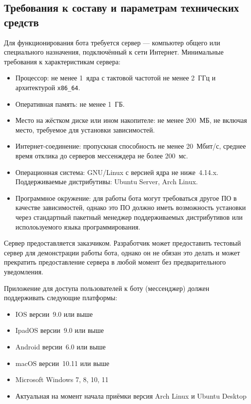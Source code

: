\subsection{Требования к составу и параметрам технических средств}
    \label{sec:req:hw}
    Для функционирования бота требуется сервер --- компьютер общего или специального назначения,
    подключённый к сети Интернет. Минимальные требования к характеристикам сервера:
    \begin{itemize}
        \item
            Процессор: не менее 1~ядра с тактовой частотой не менее 2~ГГц и архитектурой
            \texttt{x86\_64}.
        \item
            Оперативная память: не менее 1~ГБ.
        \item
            Место на жёстком диске или ином накопителе: не менее 200~МБ, не включая место, требуемое
            для установки зависимостей.
        \item
            Интернет-соединение: пропускная способность не менее 20~Мбит/с, среднее время отклика
            до серверов мессенждера не более 200~мс.
        \item
            Операционная система: GNU/Linux с версией ядра не ниже~4.14.x.
            Поддерживаемые дистрибутивы: Ubuntu Server, Arch Linux.
        \item
            Программное окружение: для работы бота могут требоваться другое ПО в качестве зависимостей,
            однако это ПО должно иметь возможность установки через стандартный пакетный менеджер
            поддерживаемых дистрибутивов или исполоьзуемого языка программирования.
    \end{itemize}
    Сервер предоставляется заказчиком. Разработчик может предоставить тестовый сервер для демонстрации
    работы бота, однако он не обязан это делать и может прекратить предоставление сервера в любой момент
    без предварительного уведомления.

    Приложение для доступа пользователей к боту (мессенджер) должен поддерживать следующие платформы:
    \begin{itemize}
        \item
            IOS версии~9.0 или выше
        \item
            IpadOS версии~9.0 или выше
        \item
            Android версии~6.0 или выше
        \item
            macOS версии~10.11 или выше
        \item
            Microsoft Windows 7, 8, 10, 11
        \item
            Актуальная на момент начала приёмки версия Arch Linux и Ubuntu Desktop
    \end{itemize}

